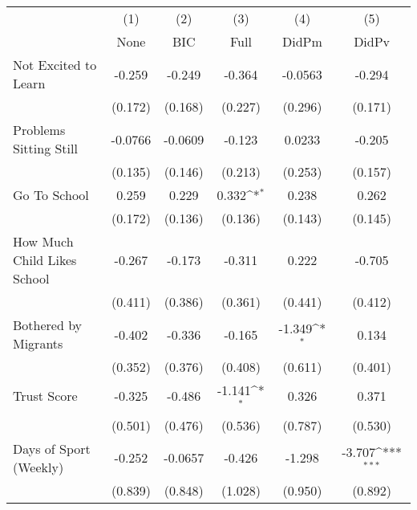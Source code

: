{
\def\sym#1{\ifmmode^{#1}\else\(^{#1}\)\fi}
\begin{tabular}{l*{5}{c}}
\toprule
            &\multicolumn{1}{c}{(1)}&\multicolumn{1}{c}{(2)}&\multicolumn{1}{c}{(3)}&\multicolumn{1}{c}{(4)}&\multicolumn{1}{c}{(5)}\\
            &\multicolumn{1}{c}{None}&\multicolumn{1}{c}{BIC}&\multicolumn{1}{c}{Full}&\multicolumn{1}{c}{DidPm}&\multicolumn{1}{c}{DidPv}\\
\midrule
Not Excited to Learn&      -0.259         &      -0.249         &      -0.364         &     -0.0563         &      -0.294         \\
            &     (0.172)         &     (0.168)         &     (0.227)         &     (0.296)         &     (0.171)         \\
\addlinespace
Problems Sitting Still&     -0.0766         &     -0.0609         &      -0.123         &      0.0233         &      -0.205         \\
            &     (0.135)         &     (0.146)         &     (0.213)         &     (0.253)         &     (0.157)         \\
\addlinespace
Go To School&       0.259         &       0.229         &       0.332\sym{*}  &       0.238         &       0.262         \\
            &     (0.172)         &     (0.136)         &     (0.136)         &     (0.143)         &     (0.145)         \\
\addlinespace
How Much Child Likes School&      -0.267         &      -0.173         &      -0.311         &       0.222         &      -0.705         \\
            &     (0.411)         &     (0.386)         &     (0.361)         &     (0.441)         &     (0.412)         \\
\addlinespace
Bothered by Migrants&      -0.402         &      -0.336         &      -0.165         &      -1.349\sym{*}  &       0.134         \\
            &     (0.352)         &     (0.376)         &     (0.408)         &     (0.611)         &     (0.401)         \\
\addlinespace
Trust Score &      -0.325         &      -0.486         &      -1.141\sym{*}  &       0.326         &       0.371         \\
            &     (0.501)         &     (0.476)         &     (0.536)         &     (0.787)         &     (0.530)         \\
\addlinespace
Days of Sport (Weekly)&      -0.252         &     -0.0657         &      -0.426         &      -1.298         &      -3.707\sym{***}\\
            &     (0.839)         &     (0.848)         &     (1.028)         &     (0.950)         &     (0.892)         \\
\bottomrule
\end{tabular}
}
